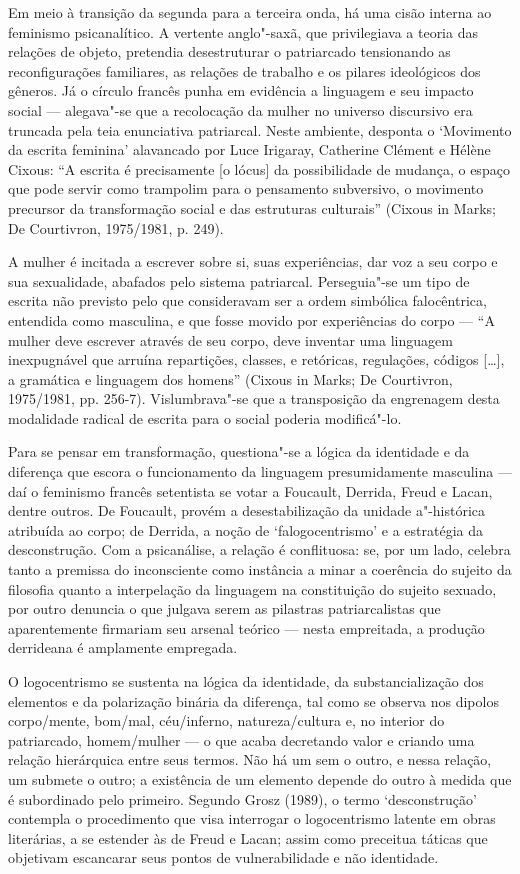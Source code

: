 Em meio à transição da segunda para a terceira onda, há uma cisão
interna ao feminismo psicanalítico. A vertente anglo"-saxã, que
privilegiava a teoria das relações de objeto, pretendia desestruturar o
patriarcado tensionando as reconfigurações familiares, as relações de
trabalho e os pilares ideológicos dos gêneros. Já o círculo francês
punha em evidência a linguagem e seu impacto social --- alegava"-se que a
recolocação da mulher no universo discursivo era truncada pela teia
enunciativa patriarcal. Neste ambiente, desponta o `Movimento da escrita
feminina' alavancado por Luce Irigaray, Catherine Clément e Hélène
Cixous: ``A escrita é precisamente {[}o lócus{]} da possibilidade de
mudança, o espaço que pode servir como trampolim para o pensamento
subversivo, o movimento precursor da transformação social e das
estruturas culturais'' (Cixous in Marks; De Courtivron, 1975/1981, p.
249).

A mulher é incitada a escrever sobre si, suas experiências, dar voz a
seu corpo e sua sexualidade, abafados pelo sistema patriarcal.
Perseguia"-se um tipo de escrita não previsto pelo que consideravam ser a
ordem simbólica falocêntrica, entendida como masculina, e que fosse
movido por experiências do corpo --- ``A mulher deve escrever através de
seu corpo, deve inventar uma linguagem inexpugnável que arruína
repartições, classes, e retóricas, regulações, códigos {[}\ldots{}{]}, a
gramática e linguagem dos homens'' (Cixous in Marks; De Courtivron,
1975/1981, pp. 256-7). Vislumbrava"-se que a transposição da engrenagem
desta modalidade radical de escrita para o social poderia modificá"-lo.

Para se pensar em transformação, questiona"-se a lógica da identidade e
da diferença que escora o funcionamento da linguagem presumidamente
masculina --- daí o feminismo francês setentista se votar a Foucault,
Derrida, Freud e Lacan, dentre outros. De Foucault, provém a
desestabilização da unidade a"-histórica atribuída ao corpo; de Derrida,
a noção de `falogocentrismo' e a estratégia da desconstrução. Com a
psicanálise, a relação é conflituosa: se, por um lado, celebra tanto a
premissa do inconsciente como instância a minar a coerência do sujeito
da filosofia quanto a interpelação da linguagem na constituição do
sujeito sexuado, por outro denuncia o que julgava serem as pilastras
patriarcalistas que aparentemente firmariam seu arsenal teórico --- nesta
empreitada, a produção derrideana é amplamente empregada.

O logocentrismo se sustenta na lógica da identidade, da
substancialização dos elementos e da polarização binária da diferença,
tal como se observa nos dipolos corpo/mente, bom/mal, céu/inferno,
natureza/cultura e, no interior do patriarcado, homem/mulher --- o que
acaba decretando valor e criando uma relação hierárquica entre seus
termos. Não há um sem o outro, e nessa relação, um submete o outro; a
existência de um elemento depende do outro à medida que é subordinado
pelo primeiro. Segundo Grosz (1989), o termo `desconstrução' contempla o
procedimento que visa interrogar o logocentrismo latente em obras
literárias, a se estender às de Freud e Lacan; assim como preceitua
táticas que objetivam escancarar seus pontos de vulnerabilidade e não
identidade.

